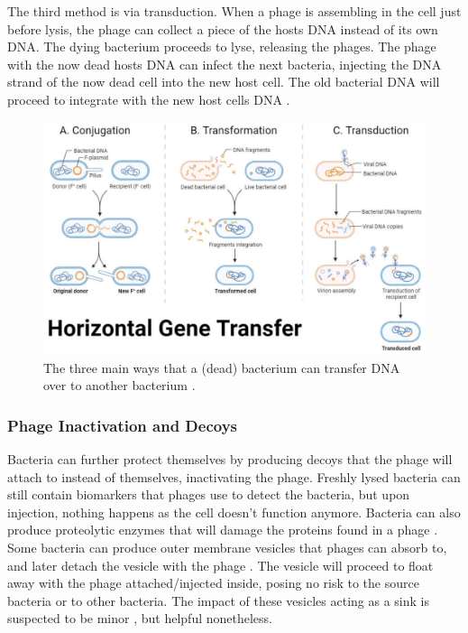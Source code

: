 The third method is via transduction. 
When a phage is assembling in the cell just before lysis, the phage can collect a piece of the hosts DNA instead of its own DNA. 
The dying bacterium proceeds to lyse, releasing the phages. 
The phage with the now dead hosts DNA can infect the next bacteria, injecting the DNA strand of the now dead cell into the new host cell. 
The old bacterial DNA will proceed to integrate with the new host cells DNA \cite{tamangHorizontalGeneTransfer2023}. 

\begin{figure}
    \centering
    \includegraphics[width=0.7\linewidth]{Chapters/Figures/horizontal_gene_transfer.png}
    \caption{The three main ways that a (dead) bacterium can transfer DNA over to another bacterium \cite{tamangHorizontalGeneTransfer2023}.}
    \label{fig:horizontal_gene_transfer}
\end{figure}

\subsubsection{Phage Inactivation and Decoys}
Bacteria can further protect themselves by producing decoys that the phage will attach to instead of themselves, inactivating the phage. 
Freshly lysed bacteria can still contain biomarkers that phages use to detect the bacteria, but upon injection, nothing happens as the cell doesn't function anymore. 
Bacteria can also produce proteolytic enzymes that will damage the proteins found in a phage \cite{tanQuorumSensingDetermines2015}. 
Some bacteria can produce outer membrane vesicles that phages can absorb to, and later detach the vesicle with the phage \cite{rabinovitchBacterialDebrisEcological2003}. 
The vesicle will proceed to float away with the phage attached/injected inside, posing no risk to the source bacteria or to other bacteria. 
The impact of these vesicles acting as a sink is suspected to be minor \cite{bullPhageBacterialDynamicsSpatial2018}, but helpful nonetheless. 

